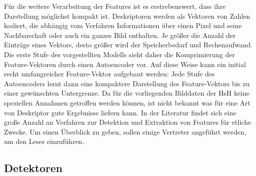 Für die weitere Verarbeitung der Features ist es erstrebenswert, dass ihre Darstellung möglichst kompakt ist. Deskriptoren werden als Vektoren von Zahlen kodiert, die abhängig vom Verfahren Informationen über einen Pixel und seine Nachbarschaft oder auch ein ganzes Bild enthalten. Je größer die Anzahl der Einträge eines Vektors, desto größer wird der Speicherbedarf und Rechenaufwand.
Die erste Stufe des vorgestellten Modells sieht daher die Komprimierung der Feature-Vektoren durch einen Autoencoder vor. Auf diese Weise kann ein initial recht umfangreicher Feature-Vektor aufgebaut werden: Jede Stufe des Autoencoders lernt dann eine kompaktere Darstellung des Feature-Vektors bis zu einer gewünschten Untergrenze.\newline
Da für die vorliegenden Bilddaten der HsH keine speziellen Annahmen getroffen werden können, ist nicht bekannt was für eine Art von Deskriptor gute Ergebnisse liefern kann. In der Literatur findet sich eine große Anzahl an Verfahren zur Detektion und Extraktion von Features für etliche Zwecke. Um einen Überblick zu geben, sollen einige Vertreter angeführt werden, um den Leser einzuführen.

\subsection{Detektoren}


